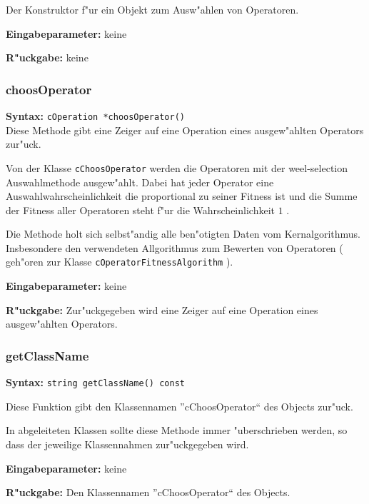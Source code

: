 Der Konstruktor f"ur ein Objekt zum Ausw"ahlen von Operatoren.

\bigskip\noindent
\textbf{Eingabeparameter:} keine

\bigskip\noindent
\textbf{R"uckgabe:} keine


\subsubsection{choosOperator}

\textbf{Syntax:} \verb|cOperation *choosOperator()| \\

Diese Methode gibt eine Zeiger auf eine Operation eines ausgew"ahlten Operators zur"uck.

Von der Klasse \verb|cChoosOperator| werden die Operatoren mit der weel-selection Auswahlmethode ausgew"ahlt. Dabei hat jeder Operator eine Auswahlwahrscheinlichkeit die proportional zu seiner Fitness ist und die Summe der Fitness aller Operatoren steht f"ur die Wahrscheinlichkeit $1$ .

Die Methode holt sich selbst"andig alle ben"otigten Daten vom Kernalgorithmus. Insbesondere den verwendeten Allgorithmus zum Bewerten von Operatoren ( geh"oren zur Klasse \verb|cOperatorFitnessAlgorithm| ).

\bigskip\noindent
\textbf{Eingabeparameter:} keine

\bigskip\noindent
\textbf{R"uckgabe:} Zur"uckgegeben wird eine Zeiger auf eine Operation eines ausgew"ahlten Operators.


\subsubsection{getClassName}

\textbf{Syntax:} \verb|string getClassName() const|

\bigskip\noindent
Diese Funktion gibt den Klassennamen ''cChoosOperator`` des Objects zur"uck.

In abgeleiteten Klassen sollte diese Methode immer "uberschrieben werden, so dass der jeweilige Klassennahmen zur"uckgegeben wird.

\bigskip\noindent
\textbf{Eingabeparameter:} keine

\bigskip\noindent
\textbf{R"uckgabe:} Den Klassennamen ''cChoosOperator`` des Objects.



